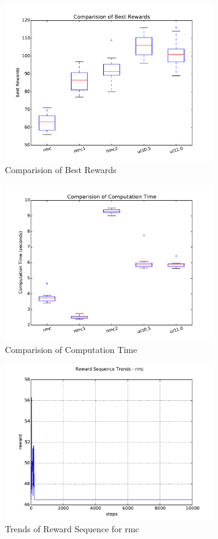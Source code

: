 \documentclass{article}
\begin{document}
\begin{figure}[htbp!]
\centering
\includegraphics[width=0.8\textwidth]{best_reward_compare.pdf}
\caption{\label{fig:optimality}Comparision of Best Rewards}
\end{figure}

\begin{figure}[htbp!]
\centering
\includegraphics[width=0.8\textwidth]{computation_time_compare.pdf}
\caption{\label{fig:computation_time}Comparision of Computation Time}
\end{figure}

\begin{figure}[htb!]
\centering
\includegraphics[width=0.8\textwidth]{trends_rmc.pdf}
\caption{\label{fig:trends_rmc}Trends of Reward Sequence for rmc}
\end{figure}
\end{document}
